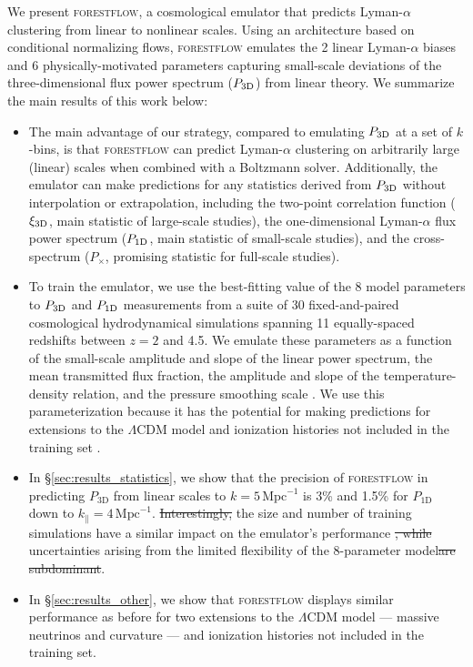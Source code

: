 \documentclass{aa}
\newcommand{\lya}{Lyman-$\alpha$\xspace}
\newcommand{\pcross}{$P_{\times}$\xspace}
\newcommand{\poned}{\ensuremath{P_{\rm 1D}}\xspace}
\newcommand{\xithreed}{\ensuremath{\xi_{\rm 3D}}\xspace}
\newcommand{\pthreed}{\ensuremath{P_{\rm 3D}}\xspace}
\newcommand{\forestflow}{\textsc{forestflow}\xspace}
\newcommand{\iMpc}{\ensuremath{\,\mathrm{Mpc}^{-1}}}
\providecommand{\DIFaddtex}[1]{{\protect\color{blue}\uwave{#1}}} %
\providecommand{\DIFdeltex}[1]{{\protect\color{red}\sout{#1}}}                      %
\providecommand{\DIFaddbegin}{} %
\providecommand{\DIFaddend}{} %
\providecommand{\DIFdelbegin}{} %
\providecommand{\DIFdelend}{} %
\providecommand{\DIFadd}[1]{\texorpdfstring{\DIFaddtex{#1}}{#1}} %
\providecommand{\DIFdel}[1]{\texorpdfstring{\DIFdeltex{#1}}{}} %
\newcommand{\DIFscaledelfig}{0.5}
\newlength{\DIFdelgraphicswidth} %
\newlength{\DIFdelgraphicsheight} %
\newcommand{\DIFaddincludegraphics}[2][]{{\color{blue}\fbox{\DIFOincludegraphics[#1]{#2}}}} %
\newcommand{\DIFdelincludegraphics}[2][]{%
\sbox{\DIFdelgraphicsbox}{\DIFOincludegraphics[#1]{#2}}%
\settoboxwidth{\DIFdelgraphicswidth}{\DIFdelgraphicsbox} %
\settoboxtotalheight{\DIFdelgraphicsheight}{\DIFdelgraphicsbox} %
\scalebox{\DIFscaledelfig}{%
\parbox[b]{\DIFdelgraphicswidth}{\usebox{\DIFdelgraphicsbox}\\[-\baselineskip] \rule{\DIFdelgraphicswidth}{0em}}\llap{\resizebox{\DIFdelgraphicswidth}{\DIFdelgraphicsheight}{%
\setlength{\unitlength}{\DIFdelgraphicswidth}%
\begin{picture}(1,1)%
\thicklines\linethickness{2pt} %
{\color[rgb]{1,0,0}\put(0,0){\framebox(1,1){}}}%
{\color[rgb]{1,0,0}\put(0,0){\line( 1,1){1}}}%
{\color[rgb]{1,0,0}\put(0,1){\line(1,-1){1}}}%
\end{picture}%
}\hspace*{3pt}}} %
} %
\DeclareRobustCommand{\DIFaddbegin}{\DIFOaddbegin \let\includegraphics\DIFaddincludegraphics} %
\DeclareRobustCommand{\DIFaddend}{\DIFOaddend \let\includegraphics\DIFOincludegraphics} %
\DeclareRobustCommand{\DIFdelbegin}{\DIFOdelbegin \let\includegraphics\DIFdelincludegraphics} %
\DeclareRobustCommand{\DIFdelend}{\DIFOaddend \let\includegraphics\DIFOincludegraphics} %
\begin{document}
We present \forestflow, a cosmological emulator that predicts \lya clustering from linear to nonlinear scales. Using an architecture based on conditional normalizing flows, \forestflow emulates the 2 linear \lya biases \DIFaddbegin \DIFadd{($b_\delta$ and $b_\eta$) }\DIFaddend and 6 physically-motivated parameters capturing small-scale deviations of the three-dimensional flux power spectrum (\pthreed) from linear theory. We summarize the main results of this work below:

\begin{itemize}
    \item The main advantage of our strategy, compared to emulating \pthreed at a set of $k$-bins, is that \forestflow can predict \lya clustering on arbitrarily large (linear) scales when combined with a Boltzmann solver. Additionally, the emulator can make predictions for any statistics derived from \pthreed without interpolation or extrapolation, including the two-point correlation function (\xithreed, main statistic of large-scale studies), the one-dimensional \lya flux power spectrum (\poned, main statistic of small-scale studies), and the cross-spectrum (\pcross, promising statistic for full-scale studies).

    \item To train the emulator, we use the best-fitting value of the 8 model parameters to \pthreed and \poned measurements from a suite of 30 fixed-and-paired cosmological hydrodynamical simulations spanning 11 equally-spaced redshifts between $z=2$ and 4.5. We emulate these parameters as a function of the small-scale amplitude and slope of the linear power spectrum, the mean transmitted flux fraction, the amplitude and slope of the temperature-density relation, and the pressure smoothing scale \citep[see][]{Pedersen2021}. We use this parameterization because it has the potential for making predictions for extensions to the $\Lambda$CDM model and ionization histories not included in the training set \citep[][]{ pedersen2023CompressingCosmologicalInformation, cabayol-garcia2023NeuralNetworkEmulator}. 

    \item In \S\ref{sec:results_statistics}, we show that the precision of \textsc{forestflow} in predicting $P_\mathrm{3D}$ from linear scales to $k=5\iMpc$ is 3\% and 1.5\% for $P_\mathrm{1D}$ down to $k_\parallel=4\iMpc$. \DIFdelbegin \DIFdel{Interestingly, }\DIFdelend \DIFaddbegin \DIFadd{We find that }\DIFaddend the size and number of training simulations have a similar impact on the emulator's performance \DIFdelbegin \DIFdel{, while }\DIFdelend \DIFaddbegin \DIFadd{as }\DIFaddend uncertainties arising from the limited flexibility of the 8-parameter model\DIFdelbegin \DIFdel{are subdominant}\DIFdelend . 

    \item In \S\ref{sec:results_other}, we show that \forestflow displays similar performance as before for two extensions to the $\Lambda$CDM model --- massive neutrinos and curvature --- and ionization histories not included in the training set. 
\end{itemize}
\end{document}

